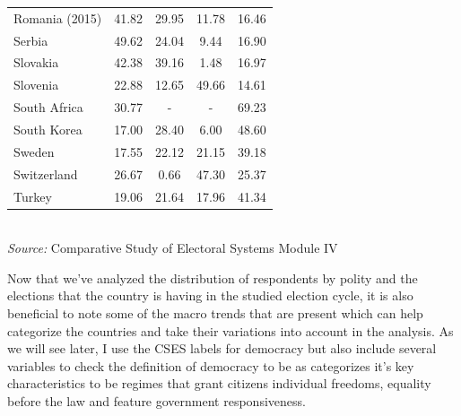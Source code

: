 \documentclass[12pt, titlepage]{article}
\newcommand\e{\emph}
\newcommand\tb{\textbf}
\begin{document}
\begin{table}
\begin{tabulary}{\linewidth}{l c c c c}
		Romania (2015)&41.82&29.95&11.78&16.46 \\
		Serbia&49.62&24.04&9.44&16.90 \\
		Slovakia&42.38&39.16&1.48&16.97 \\
		Slovenia&22.88&12.65&49.66&14.61 \\
		South Africa&30.77&-&-&69.23 \\
		South Korea&17.00&28.40&6.00&48.60 \\
		Sweden&17.55&22.12&21.15&39.18 \\
		Switzerland&26.67&0.66&47.30&25.37 \\
		Turkey&19.06&21.64&17.96&41.34 \\
		\hline
	\end{tabulary} \\
\e{Source:} Comparative Study of Electoral Systems Module IV 
\label{table2}
\end{table}



Now that we've analyzed the distribution of respondents by polity and the elections that the country is having in the studied election cycle, it is also beneficial to note some of the macro trends that are present which can help categorize the countries and take their variations into account in the analysis. As we will see later, I use the CSES labels for democracy but also include several variables to check the definition of democracy to be as \cite{diamond2004overview} categorizes it's key characteristics to be regimes that grant citizens individual freedoms, equality before the law and feature government responsiveness.
\end{document}
